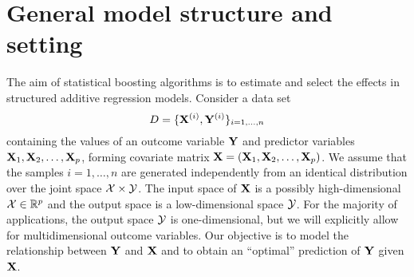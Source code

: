 \section{General model structure and setting} %
The aim of statistical boosting algorithms is to estimate and select the effects in structured additive regression models. Consider a data set
\begin{equation}
    D=\{\mathbf{X}^{(i)},\mathbf{Y}^{(i)}\}_{i=1,\ldots,n}
\end{equation}
containing the values of an outcome variable $\mathbf{Y}$ and predictor variables $\mathbf{X}_1, \mathbf{X}_2,\ldots,\mathbf{X}_p$, forming covariate matrix $\mathbf{X}=(\mathbf{X}_1, \mathbf{X}_2,\ldots,\mathbf{X}_p)$. We assume that the samples $i=1,\ldots,n$ are generated independently from an identical distribution over the joint space $\mathcal{X}\times\mathcal{Y}$. The input space of $\mathbf{X}$ is a possibly high-dimensional $\mathcal{X}\in\mathbb{R}^p$ and the output space is a low-dimensional space $\mathcal{Y}$. For the majority of applications, the output space $\mathcal{Y}$ is one-dimensional, but we will explicitly allow for multidimensional outcome variables. Our objective is to model the relationship between $\mathbf{Y}$ and $\mathbf{X}$ and to obtain an ``optimal'' prediction of $\mathbf{Y}$ given $\mathbf{X}$. 

